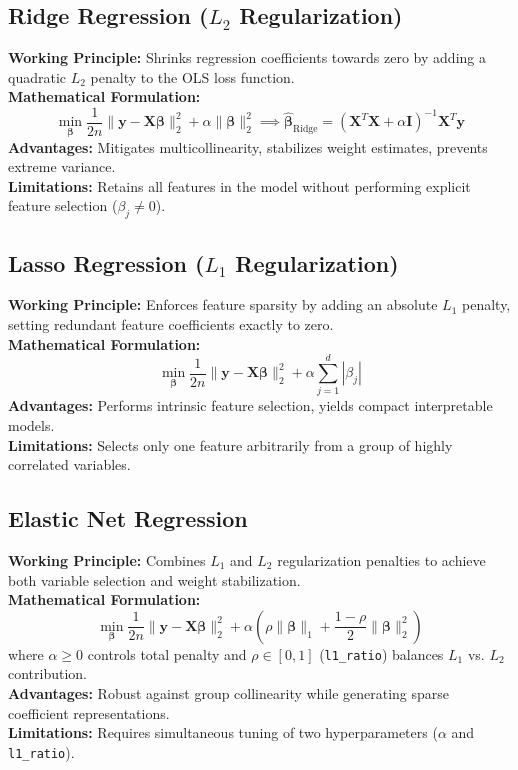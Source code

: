 \documentclass[12pt,a4paper]{article}
\begin{document}
\subsection{Ridge Regression ($L_2$ Regularization)}
\textbf{Working Principle:} Shrinks regression coefficients towards zero by adding a quadratic $L_2$ penalty to the OLS loss function.\\
\textbf{Mathematical Formulation:}
\begin{equation}
    \min_{\boldsymbol{\beta}} \frac{1}{2n} \|\mathbf{y} - \mathbf{X}\boldsymbol{\beta}\|_2^2 + \alpha \|\boldsymbol{\beta}\|_2^2 \implies \hat{\boldsymbol{\beta}}_{\text{Ridge}} = \left(\mathbf{X}^T \mathbf{X} + \alpha \mathbf{I}\right)^{-1} \mathbf{X}^T \mathbf{y}
\end{equation}
\textbf{Advantages:} Mitigates multicollinearity, stabilizes weight estimates, prevents extreme variance.\\
\textbf{Limitations:} Retains all features in the model without performing explicit feature selection ($\beta_j \neq 0$).

\subsection{Lasso Regression ($L_1$ Regularization)}
\textbf{Working Principle:} Enforces feature sparsity by adding an absolute $L_1$ penalty, setting redundant feature coefficients exactly to zero.\\
\textbf{Mathematical Formulation:}
\begin{equation}
    \min_{\boldsymbol{\beta}} \frac{1}{2n} \|\mathbf{y} - \mathbf{X}\boldsymbol{\beta}\|_2^2 + \alpha \sum_{j=1}^d |\beta_j|
\end{equation}
\textbf{Advantages:} Performs intrinsic feature selection, yields compact interpretable models.\\
\textbf{Limitations:} Selects only one feature arbitrarily from a group of highly correlated variables.

\subsection{Elastic Net Regression}
\textbf{Working Principle:} Combines $L_1$ and $L_2$ regularization penalties to achieve both variable selection and weight stabilization.\\
\textbf{Mathematical Formulation:}
\begin{equation}
    \min_{\boldsymbol{\beta}} \frac{1}{2n} \|\mathbf{y} - \mathbf{X}\boldsymbol{\beta}\|_2^2 + \alpha \left( \rho \|\boldsymbol{\beta}\|_1 + \frac{1-\rho}{2} \|\boldsymbol{\beta}\|_2^2 \right)
\end{equation}
where $\alpha \ge 0$ controls total penalty and $\rho \in [0, 1]$ (\texttt{l1\_ratio}) balances $L_1$ vs. $L_2$ contribution.\\
\textbf{Advantages:} Robust against group collinearity while generating sparse coefficient representations.\\
\textbf{Limitations:} Requires simultaneous tuning of two hyperparameters ($\alpha$ and \texttt{l1\_ratio}).
\end{document}
